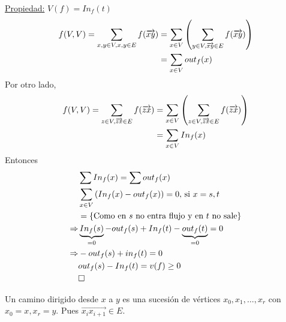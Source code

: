 \documentclass[12pt,a4paper]{article}
\begin{document}
\underline{Propiedad:} $V(f) = In_{f}(t)$
\begin{align*}
    f(V,V) = \sum_{x,y \in V, x,y\in E} f(\overrightarrow{xy}) &= \sum_{x\in V} \left(\sum_{y\in V, \overrightarrow{xy}\in E}f(\overrightarrow{xy})\right)\\
    &= \sum_{x \in V} out_{f}(x)
\end{align*}
Por otro lado,
\begin{align*}
    f(V,V) = \sum_{z \in V, \overrightarrow{zx}\in E} f(\overrightarrow{zx}) &= \sum_{x\in V} \left(\sum_{z\in V, \overrightarrow{zx}\in E} f(\overrightarrow{zx})\right)\\
    &= \sum_{x\in V} In_{f}(x)\\
\end{align*}
Entonces
\begin{align*}
    &\sum In_{f}(x) = \sum out_{f}(x)\\
    &\sum_{x\in V}\left(In_{f}(x) - out_{f}(x)\right) = 0,\, \text{si $x=s,t$}\\
    &=\left\lbrace \text{Como en $s$ no entra flujo y en $t$ no sale} \right\rbrace\\
    \Rightarrow &\underbrace{In_{f}(s)}_{=0} - out_{f}(s) + In_{f}(t) - \underbrace{out_{f}(t)}_{=0} = 0\\
    \Rightarrow &- out_{f}(s) + in_{f}(t) = 0\\
    &out_{f}(s) - In_{f}(t) = v(f) \geq 0\\
    &\square
\end{align*} 

\begin{definition} Un camino dirigido desde $x$ a $y$ es una sucesión de vértices 
    $x_{0}, x_{1}, \ldots, x_{r}$ con $x_{0} = x, x_{r} = y$. Pues $\overrightarrow{x_{i}x_{i+1}}\in E$.
\end{definition}
\end{document}
